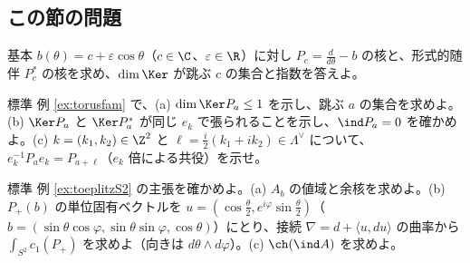 \subsection*{この節の問題}
\begin{prob}{基本}\label{p:S1jump}
$b(\theta)=c+\varepsilon\cos\theta$（$c\in\C$、$\varepsilon\in\R$）に対し $P_c=\frac d{d\theta}-b$ の核と、形式的随伴 $P_c^*$ の核を求め、$\dim\Ker$ が跳ぶ $c$ の集合と指数を答えよ。
\end{prob}
\begin{prob}{標準}\label{p:torusfam}
例 \ref{ex:torusfam} で、(a) $\dim\Ker P_a\le1$ を示し、跳ぶ $a$ の集合を求めよ。(b) $\Ker P_a$ と $\Ker P_a^*$ が同じ $e_k$ で張られることを示し、$\ind P_a=0$ を確かめよ。(c) $k=(k_1,k_2)\in\Z^2$ と $\ell=\frac i2(k_1+ik_2)\in\Lambda^\vee$ について、$e_k^{-1}P_ae_k=P_{a+\ell}$（$e_k$ 倍による共役）を示せ。
\end{prob}
\begin{prob}{標準}\label{p:toeplitz}
例 \ref{ex:toeplitzS2} の主張を確かめよ。(a) $A_b$ の値域と余核を求めよ。(b) $P_+(b)$ の単位固有ベクトルを $u=(\cos\frac\theta2,e^{i\varphi}\sin\frac\theta2)$（$b=(\sin\theta\cos\varphi,\sin\theta\sin\varphi,\cos\theta)$）にとり、接続 $\nabla=d+\langle u,du\rangle$ の曲率から $\int_{S^2}c_1(P_+)$ を求めよ（向きは $d\theta\wedge d\varphi$）。(c) $\ch(\ind A)$ を求めよ。
\end{prob}
